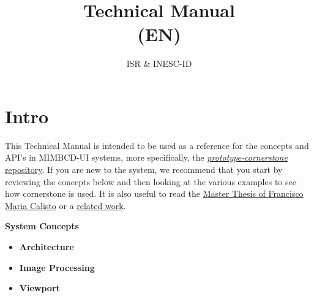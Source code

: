 \documentclass{tufte-book} %
\title{Technical Manual\\(EN)}
\author[Technical Manual]{ISR \& INESC-ID}
\begin{document}
\maketitle

\let\cleardoublepage\clearpage

\tableofcontents

\let\cleardoublepage\clearpage


\chapter{Intro}

This Technical Manual is intended to be used as a reference for the concepts and API's in MIMBCD-UI systems, more specifically, the \href{https://github.com/MIMBCD-UI/prototype-cornerstone}{\textit{prototype-cornerstone} repository}. If you are new to the system, we recommend that you start by reviewing the concepts below and then looking at the various examples to see how cornerstone is used. It is also useful to read the \href{https://github.com/MIMBCD-UI/master-dissertation}{Master Thesis of Francisco Maria Calisto\cite{mimbcd-ui_dissertation}} or a \href{https://dl.acm.org/citation.cfm?id=3134111&CFID=840856188&CFTOKEN=51535574}{related work\cite{Calisto:2017:TTM:3132272.3134111}}.

\hfill

\textbf{System Concepts}

\begin{itemize}
\item \textbf{Architecture}
\item \textbf{Image Processing}
\item \textbf{Viewport}
\end{itemize}

\hfill

\end{document}
